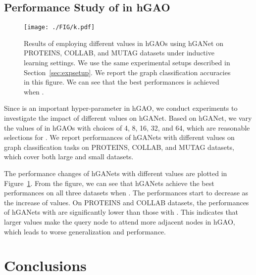 \documentclass[sigconf]{acmart}
\begin{document}
\subsection{Performance Study of  in hGAO}

\begin{figure}[t] \texttt{[image: ./FIG/k.pdf]}
\caption{ Results of employing different  values in hGAOs using hGANet on
PROTEINS, COLLAB, and MUTAG datasets under inductive learning settings.
We use the same experimental setups
described in Section~\ref{sec:expsetup}. We report the graph classification
accuracies in this figure. We can see that the best performances is achieved
when .}\label{fig:k_exp}
\end{figure}

Since  is an important hyper-parameter in hGAO, we conduct experiments to
investigate the impact of different  values on hGANet. Based on hGANet, we
vary the values of  in hGAOs with choices of 4, 8, 16, 32, and 64, which
are reasonable selections for . We report performances of hGANets with
different  values on graph classification tasks on PROTEINS, COLLAB, and
MUTAG datasets, which cover both large and small datasets.


The performance changes of hGANets with different  values are plotted in
Figure~\ref{fig:k_exp}. From the figure, we can see that hGANets achieve the
best performances on all three datasets when . The performances start to
decrease as the increase of  values. On PROTEINS and COLLAB datasets, the
performances of hGANets with  are significantly lower than those with
. This indicates that larger  values make the query node to attend
more adjacent nodes in hGAO, which leads to worse generalization and
performance.



\section{Conclusions}
\end{document}
